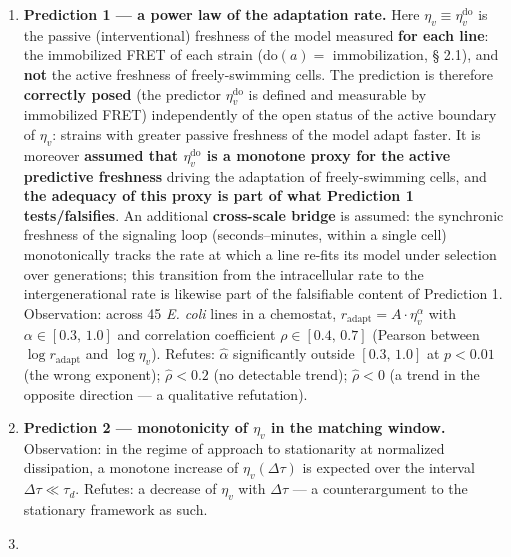 \documentclass[pdflatex,sn-mathphys-ay]{sn-jnl}
\providecommand{\tightlist}{\setlength{\itemsep}{0pt}\setlength{\parskip}{0pt}}
\begin{document}
\begin{enumerate}
\def\labelenumi{\arabic{enumi}.}
\tightlist
\item
  \textbf{Prediction 1 --- a power law of the adaptation rate.} Here \(\eta_v \equiv \eta_v^{\mathrm{do}}\) is the passive (interventional) freshness of the model measured \textbf{for each line}: the immobilized FRET of each strain (\(\mathrm{do}(a) =\) immobilization, § 2.1), and \textbf{not} the active freshness of freely-swimming cells. The prediction is therefore \textbf{correctly posed} (the predictor \(\eta_v^{\mathrm{do}}\) is defined and measurable by immobilized FRET) independently of the open status of the active boundary of \(\eta_v\): strains with greater passive freshness of the model adapt faster. It is moreover \textbf{assumed that \(\eta_v^{\mathrm{do}}\) is a monotone proxy for the active predictive freshness} driving the adaptation of freely-swimming cells, and \textbf{the adequacy of this proxy is part of what Prediction 1 tests/falsifies}. An additional \textbf{cross-scale bridge} is assumed: the synchronic freshness of the signaling loop (seconds--minutes, within a single cell) monotonically tracks the rate at which a line re-fits its model under selection over generations; this transition from the intracellular rate to the intergenerational rate is likewise part of the falsifiable content of Prediction 1. Observation: across 45 \emph{E. coli} lines in a chemostat, \(r_{\text{adapt}} = A \cdot \eta_v^{\alpha}\) with \(\alpha \in [0.3,\, 1.0]\) and correlation coefficient \(\rho \in [0.4,\, 0.7]\) (Pearson between \(\log r_{\text{adapt}}\) and \(\log \eta_v\)). Refutes: \(\hat{\alpha}\) significantly outside \([0.3,\, 1.0]\) at \(p < 0.01\) (the wrong exponent); \(\hat{\rho} < 0.2\) (no detectable trend); \(\hat{\rho} < 0\) (a trend in the opposite direction --- a qualitative refutation).
\item
  \textbf{Prediction 2 --- monotonicity of \(\eta_v\) in the matching window.} Observation: in the regime of approach to stationarity at normalized dissipation, a monotone increase of \(\eta_v(\Delta\tau)\) is expected over the interval \(\Delta\tau \ll \tau_d\). Refutes: a decrease of \(\eta_v\) with \(\Delta\tau\) --- a counterargument to the stationary framework as such.
\item

\end{enumerate}
\end{document}
